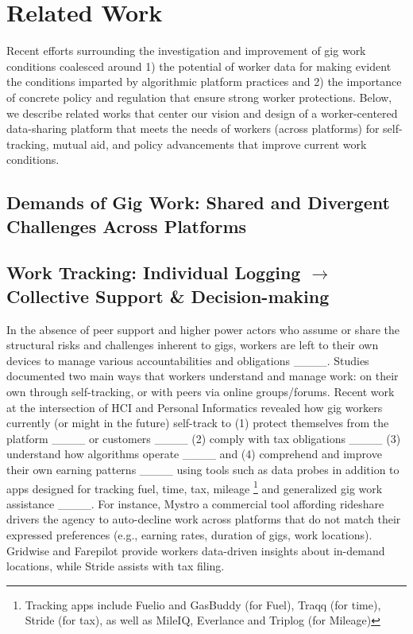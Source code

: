 \section{Related Work}
\label{Related_Work}
{Recent efforts} surrounding the investigation and improvement of gig work conditions coalesced around 1) the potential of worker data for making evident the conditions imparted by algorithmic platform practices and 2) the importance of concrete policy and regulation that ensure strong worker protections. 
Below, we describe related works that center our vision {and design} of a worker-centered data-sharing platform that meets {the needs of workers (across platforms)} for self-tracking, mutual aid, and policy advancements that improve current work conditions.


\subsection{{Demands of Gig Work: Shared and Divergent Challenges Across Platforms}}


\subsection{{Work Tracking: Individual Logging $\rightarrow$ Collective Support \& Decision-making}}
In the absence of peer support and higher power actors who assume or share the structural risks and challenges inherent to gigs, workers are left to their own devices to manage {various} accountabilities {and obligations} ____. 
Studies documented two main ways that workers understand and manage work: on their own through self-tracking, or with peers via online groups/forums. 
Recent work at the intersection of HCI and Personal Informatics revealed how gig workers currently (or might in the future) self-track to (1) protect themselves from the platform ____ or customers ____ (2) comply with tax obligations ____ (3) understand how algorithms operate ____ and (4) comprehend and improve their own earning patterns ____ using tools such as data probes {in addition to apps designed for tracking fuel, time, tax, mileage \footnote{Tracking apps include Fuelio and GasBuddy (for Fuel), Traqq (for time), Stride (for tax), as well as MileIQ, Everlance and Triplog (for Mileage)} and generalized gig work assistance ____. For instance, Mystro a commercial tool affording rideshare drivers the agency to auto-decline work across platforms that do not match their expressed preferences (e.g., earning rates, duration of gigs, work locations). 
Gridwise and Farepilot provide workers data-driven insights about in-demand locations, while Stride assists with tax filing. } 

